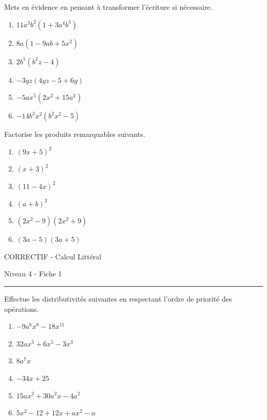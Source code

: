 \documentclass[12pt,parskip=half-, twoside=semi]{scrartcl}
\begin{document}
\begin{exercise}Mets en évidence en pensant à transformer l'écriture si nécessaire.
  \begin{enumerate}[cols=2]
      \item $11a^3b^2(1+3a^4b^3)$
      \item $8a(1-9ab+5x^2)$
      \item $2b^5(b^2z-4)$
      \item $-3yz(4yz-5+6y)$
      \item $-5ax^5(2x^2+15a^2)$
      \item $-14b^3x^2(b^2x^2-5)$
  \end{enumerate}
\end{exercise}

\begin{exercise}Factorise les produits remarquables suivants.
  \begin{enumerate}[cols=3]
    \item $(9x+5)^2$
    \item $(x+3)^2$
    \item $(11-4x)^2$
    \item $(a+b)^2$
    \item $(2x^2-9)(2x^2+9)$
    \item $(3a-5)(3a+5)$
  \end{enumerate}
\end{exercise}

\newpage
\begin{center}
  \bfseries
  \begin{Huge}
    CORRECTIF - Calcul Littéral
  \end{Huge}
  \smallbreak
  \begin{large}
    Niveau 4  - Fiche 1
  \end{large}
  \smallbreak
  \rule[10pt]{.5\linewidth}{1 pt}
\end{center}
 
\setcounter{exercise}{0}

\begin{exercise}Effectue les distributivités suivantes en respectant l'ordre de priorité des opérations.
  \begin{enumerate}[cols=2]
      \item $-9a^6x^8-18x^{11}$
      \item $32ax^5+6x^5-3x^3$
      \item $8a^7x$ 
      \item $-34x+25$
      \item $15ax^2+30a^2x-4a^2$
      \item $5x^2-12+12x+ax^2-a$
  \end{enumerate}
\end{exercise}
\end{document}
